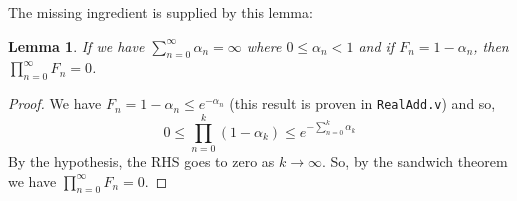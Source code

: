 \documentclass{article}
\newtheorem{lemma}[theorem]{Lemma}
\begin{document}
The missing ingredient is supplied by this lemma:
\begin{lemma}
If we have $\sum_{n=0}^\infty \alpha_n = \infty$ where $0 \le \alpha_n < 1$ and if $F_n = 1 - \alpha_n$, then $\prod_{n=0}^\infty F_n = 0$. 
\end{lemma}
\begin{proof}
    We have $F_n = 1 - \alpha_n \le e^{-\alpha_n}$ (this result is proven in \texttt {RealAdd.v}) and so,
    \[ 
    0 \le \prod_{n=0}^k (1 - \alpha_k) \le e^{- \sum_{n=0}^k \alpha_k}
    \]
    By the hypothesis, the RHS goes to zero as $k \to \infty$. So, by the sandwich theorem we have $\prod_{n=0}^\infty F_n = 0$. 
\end{proof}
\end{document}
